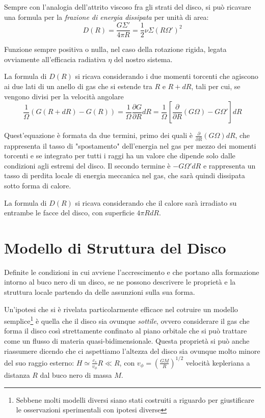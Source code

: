 \documentclass[a4paperbi]{article}
\begin{document}
	Sempre con l'analogia dell'attrito viscoso fra gli strati del disco, si può ricavare una formula per la \textit{frazione di energia dissipata} per unità di area:
	\begin{equation}
		D(R)=\frac{G\Sigma'}{4\pi R}=\frac{1}{2}\nu\Sigma(R\Omega')^2
	\end{equation}
	
	Funzione sempre positiva o nulla, nel caso della rotazione rigida, legata ovviamente all'efficacia radiativa $\eta$ del nostro sistema.
	
	La formula di $D(R)$ si ricava considerando i due momenti torcenti che agiscono ai due lati di un anello di gas che si estende tra $R$ e $R+dR$, tali per cui, se vengono divisi per la velocità angolare
	\begin{equation}
		\frac{1}{\Omega}(G(R+dR)-G(R))=\frac{1}{\Omega}\frac{\partial G}{\partial R}dR=\frac{1}{\Omega}\left[\frac{\partial}{\partial R}(G\Omega)-G\Omega'\right]dR
	\end{equation}
	
	Quest'equazione è formata da due termini, primo dei quali è $\frac{\partial}{\partial R}(G\Omega)dR$, che rappresenta il tasso di "spostamento" dell'energia nel gas per mezzo dei momenti torcenti e se integrato per tutti i raggi ha un valore che dipende solo dalle condizioni agli estremi del disco. Il secondo termine è $-G\Omega'dR$ e rappresenta un tasso di perdita locale di energia meccanica nel gas, che sarà quindi dissipata sotto forma di calore.
	
	La formula di $D(R)$ si ricava considerando che il calore sarà irradiato su entrambe le facce del disco, con superficie $4\pi RdR$.
	
\newpage
\section{Modello di Struttura del Disco}
	Definite le condizioni in cui avviene l'accrescimento e che portano alla formazione intorno al buco nero di un disco, se ne possono descrivere le proprietà e la struttura locale partendo da delle assunzioni sulla sua forma. 

	Un'ipotesi che si è rivelata particolarmente efficace nel cotruire un modello semplice\footnote{Sebbene molti modelli diversi siano stati costruiti a riguardo per giustificare le osservazioni sperimentali con ipotesi diverse} è quella che il disco sia ovunque \textit{sottile}, ovvero considerare il gas che forma il disco così strettamente confinato al piano orbitale che si può trattare come un flusso di materia quasi-bidimensionale. Questa proprietà si può anche riassumere dicendo che ci aspettiamo l'altezza del disco sia ovunque molto minore del suo raggio esterno: $H\simeq\frac{c_s}{v_\phi}R\ll R$, con $v_\phi=\left(\frac{GM}{R}\right)^{1/2}$ velocità kepleriana a distanza $R$ dal buco nero di massa $M$.
	
\end{document}
